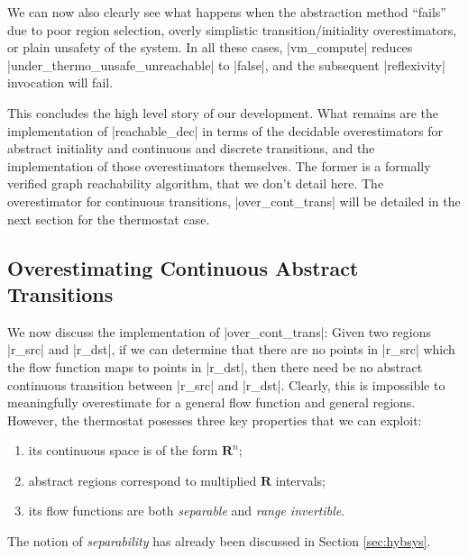 \documentclass[runningheads]{llncs}
\newcommand{\IR}{{\mathbf R}}
\begin{document}
We can now also clearly see what happens when the abstraction method ``fails'' due to poor region selection, overly simplistic transition/initiality overestimators, or plain unsafety of the system. In all these cases, |vm_compute| reduces |under_thermo_unsafe_unreachable| to |false|, and the subsequent |reflexivity| invocation will fail.

This concludes the high level story of our development. What remains
are the implementation of |reachable_dec| in terms of the decidable
overestimators for abstract initiality and continuous and discrete
transitions, and the implementation of those overestimators
themselves. The former is a formally verified graph reachability
algorithm, that we don't detail here. The overestimator for continuous
transitions, |over_cont_trans| will be detailed in the next section
for the thermostat case.

\subsection{Overestimating Continuous Abstract Transitions}
\label{over_cont_trans}

We now discuss the implementation of  |over_cont_trans|:
Given two regions |r_src| and |r_dst|, 
if we can determine that there
are no points in |r_src| which the flow function maps to points in
|r_dst|, then there need be no abstract continuous transition between |r_src|
and |r_dst|. Clearly, this is impossible to
meaningfully overestimate for a general flow function and general
regions. However, the thermostat posesses three key properties that
we can exploit:
\begin{enumerate}
\item its continuous space is of the form $\IR^n$;
\item abstract regions correspond to multiplied $\IR$ intervals;
\item its flow functions are both {\em separable\/} and {\em range invertible}.
\end{enumerate}

The notion of {\em separability\/} has already been discussed in
Section \ref{sec:hybsys}.
\end{document}
